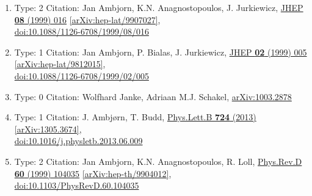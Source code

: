 \documentclass[a4paper,10pt]{article}
\begin{document}
\begin{enumerate}
\begin{enumerate}
  \item Type: 2 Citation: Jan Ambjorn, K.N. Anagnostopoulos, J. Jurkiewicz, \href{https://www.doi.org/10.1088/1126-6708/1999/08/016}{JHEP {\bf 08} (1999) 016}  \href{https://arxiv.org/abs/hep-lat/9907027}{[arXiv:hep-lat/9907027]},\\\href{https://www.doi.org/10.1088/1126-6708/1999/08/016}{doi:10.1088/1126-6708/1999/08/016}
  \item Type: 1 Citation: Jan Ambjorn, P. Bialas, J. Jurkiewicz, \href{https://www.doi.org/10.1088/1126-6708/1999/02/005}{JHEP {\bf 02} (1999) 005}  \href{https://arxiv.org/abs/hep-lat/9812015}{[arXiv:hep-lat/9812015]},\\\href{https://www.doi.org/10.1088/1126-6708/1999/02/005}{doi:10.1088/1126-6708/1999/02/005}
  \item Type: 0 Citation: Wolfhard Janke, Adriaan M.J. Schakel, \href{https://arxiv.org/abs/1003.2878}{arXiv:1003.2878}
  \item Type: 1 Citation: J. Ambjørn, T. Budd, \href{https://www.doi.org/10.1016/j.physletb.2013.06.009}{Phys.Lett.B {\bf 724} (2013) }  \href{https://arxiv.org/abs/1305.3674}{[arXiv:1305.3674]},\\\href{https://www.doi.org/10.1016/j.physletb.2013.06.009}{doi:10.1016/j.physletb.2013.06.009}
  \item Type: 2 Citation: Jan Ambjorn, K.N. Anagnostopoulos, R. Loll, \href{https://www.doi.org/10.1103/PhysRevD.60.104035}{Phys.Rev.D {\bf 60} (1999) 104035}  \href{https://arxiv.org/abs/hep-th/9904012}{[arXiv:hep-th/9904012]},\\\href{https://www.doi.org/10.1103/PhysRevD.60.104035}{doi:10.1103/PhysRevD.60.104035}

\end{enumerate}
\end{enumerate}
\end{document}
